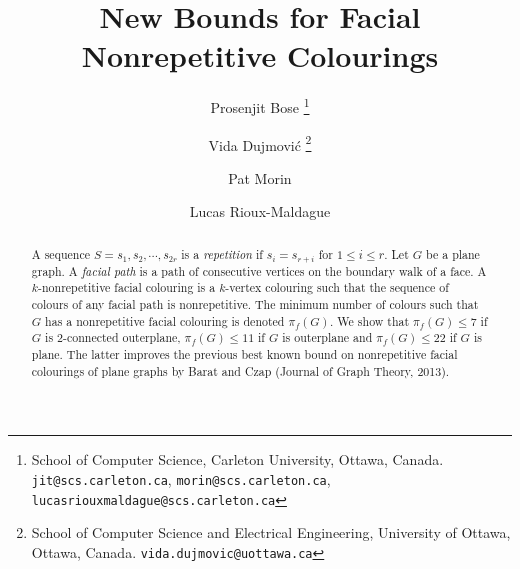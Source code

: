 \documentclass{patmorin}
\newcommand*\samethanks[1][\value{footnote}]{\footnotemark[#1]}
\begin{document}

\title{New Bounds for Facial Nonrepetitive Colourings}
\date{}


%
%
\author{Prosenjit Bose \thanks{School of Computer Science, Carleton University, Ottawa, Canada. \texttt{jit@scs.carleton.ca}, \texttt{morin@scs.carleton.ca}, \texttt{lucasriouxmaldague@scs.carleton.ca}} %
\and Vida Dujmovi{\'c} \thanks{School of Computer Science and Electrical Engineering, University of Ottawa, Ottawa, Canada. \texttt{vida.dujmovic@uottawa.ca}}
\and Pat Morin\samethanks[1] \and Lucas Rioux-Maldague\samethanks[1] }
%



%
%

\maketitle

\begin{abstract}
A sequence $S=s_1,s_2,\cdots,s_{2r}$ is a \emph{repetition} if $s_i=s_{r+i}$ for $1 \leq i \leq r$. Let $G$ be a plane graph. A \emph{facial path} is a path of consecutive vertices on the boundary walk of a face. A $k$-nonrepetitive facial colouring is a $k$-vertex colouring such that the sequence of colours of any facial path is nonrepetitive. The minimum number of colours such that $G$ has a nonrepetitive facial colouring is denoted $\pi_f(G)$. We show that $\pi_f(G)\leq 7$ if $G$ is 2-connected outerplane, $\pi_f(G) \leq 11$ if $G$ is outerplane and $\pi_f(G)\leq 22$ if $G$ is plane. The latter improves the previous best known bound on nonrepetitive facial colourings of plane graphs by Barat and Czap (Journal of Graph Theory, 2013).
\end{abstract}
\end{document}
